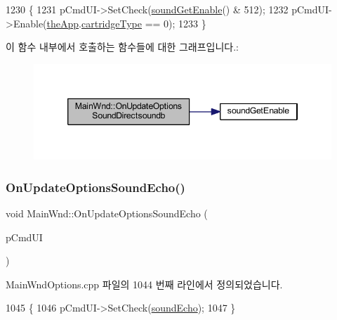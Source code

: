 \begin{DoxyCode}
1230 \{
1231   pCmdUI->SetCheck(\mbox{\hyperlink{_sound_8cpp_a3d1f6129176583804274bb162c3428a8}{soundGetEnable}}() & 512);
1232   pCmdUI->Enable(\mbox{\hyperlink{_v_b_a_8cpp_a8095a9d06b37a7efe3723f3218ad8fb3}{theApp}}.\mbox{\hyperlink{class_v_b_a_af300759fcbc7eeb00ce73f956fc5ddb7}{cartridgeType}} == 0);
1233 \}
\end{DoxyCode}
이 함수 내부에서 호출하는 함수들에 대한 그래프입니다.\+:
\nopagebreak
\begin{figure}[H]
\begin{center}
\leavevmode
\includegraphics[width=346pt]{class_main_wnd_aa1b7a906630cf65b6a41c416eaecf3c3_cgraph}
\end{center}
\end{figure}
\mbox{\label{class_main_wnd_a9b5182cec889a64c08fdd74638ef5fd9}} 
\subsubsection{\texorpdfstring{On\+Update\+Options\+Sound\+Echo()}{OnUpdateOptionsSoundEcho()}}
{\footnotesize\ttfamily void Main\+Wnd\+::\+On\+Update\+Options\+Sound\+Echo (\begin{DoxyParamCaption}\item[{C\+Cmd\+UI $\ast$}]{p\+Cmd\+UI }\end{DoxyParamCaption})\hspace{0.3cm}{\ttfamily [protected]}}



Main\+Wnd\+Options.\+cpp 파일의 1044 번째 라인에서 정의되었습니다.


\begin{DoxyCode}
1045 \{
1046   pCmdUI->SetCheck(\mbox{\hyperlink{gb_sound_8cpp_a687b8b28b681969302cdf6e804bcf8db}{soundEcho}});
1047 \}
\end{DoxyCode}
\mbox{\label{class_main_wnd_aac8ad5e0c9a1a7051aea0f5327787f94}} 
